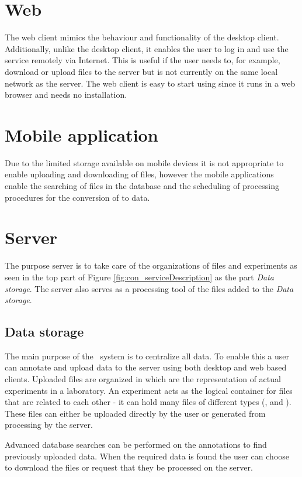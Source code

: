 \section{Web}
The web client mimics the behaviour and functionality of the desktop client. Additionally, unlike the desktop client, it enables the user to log in and use the service remotely via Internet. This is useful if the user needs to, for example, download or upload files to the server but is not currently on the same local network as the server. The web client is easy to start using since it runs in a web browser and needs no installation.


\section{Mobile application}
Due to the limited storage available on mobile devices it is not appropriate to enable uploading and downloading of files, however the mobile applications enable the searching of files in the database and the scheduling of processing procedures for the conversion of  to  data.

\section{Server}
The purpose server is to take care of the organizations of files and experiments as seen in the top part of Figure \ref{fig:con_serviceDescription} as the part \textit{Data storage}. The server also serves as a processing tool of the files added to the \textit{Data storage}. 

\subsection{Data storage}
The main purpose of the \appName\ system is to centralize all data. To enable this a user can annotate and upload data to the server using both desktop and web based clients. Uploaded files are organized in  which are the representation of actual experiments in a laboratory. An experiment acts as the logical container for files that are related to each other - it can hold many files of different types (,  and ). These files can either be uploaded directly by the user or generated from processing by the server.

Advanced database searches can be performed on the annotations to find previously uploaded data. When the required data is found the user can choose to download the files or request that they be processed on the server. 


